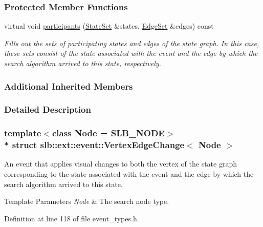 \subsubsection*{Protected Member Functions}
\begin{DoxyCompactItemize}
\item 
virtual void \hyperlink{structslb_1_1ext_1_1event_1_1VertexEdgeChange_a0c2877a01cf793c896b5c8b6ee67f65a}{participants} (\hyperlink{structslb_1_1ext_1_1event_1_1UniformChange_a2c45514041ea86f77bbd0147fe06babd}{State\+Set} \&states, \hyperlink{structslb_1_1ext_1_1event_1_1UniformChange_af17825d303d567061f2d510f231d556c}{Edge\+Set} \&edges) const 
\begin{DoxyCompactList}\small\item\em Fills out the sets of participating states and edges of the state graph. In this case, these sets consist of the state associated with the event and the edge by which the search algorithm arrived to this state, respectively. \end{DoxyCompactList}\end{DoxyCompactItemize}
\subsubsection*{Additional Inherited Members}


\subsubsection{Detailed Description}
\subsubsection*{template$<$class Node = S\+L\+B\+\_\+\+N\+O\+DE$>$\\*
struct slb\+::ext\+::event\+::\+Vertex\+Edge\+Change$<$ Node $>$}

An event that applies visual changes to both the vertex of the state graph corresponding to the state associated with the event and the edge by which the search algorithm arrived to this state. 


\begin{DoxyTemplParams}{Template Parameters}
{\em Node} & The search node type. \\
\hline
\end{DoxyTemplParams}


Definition at line 118 of file event\+\_\+types.\+h.



